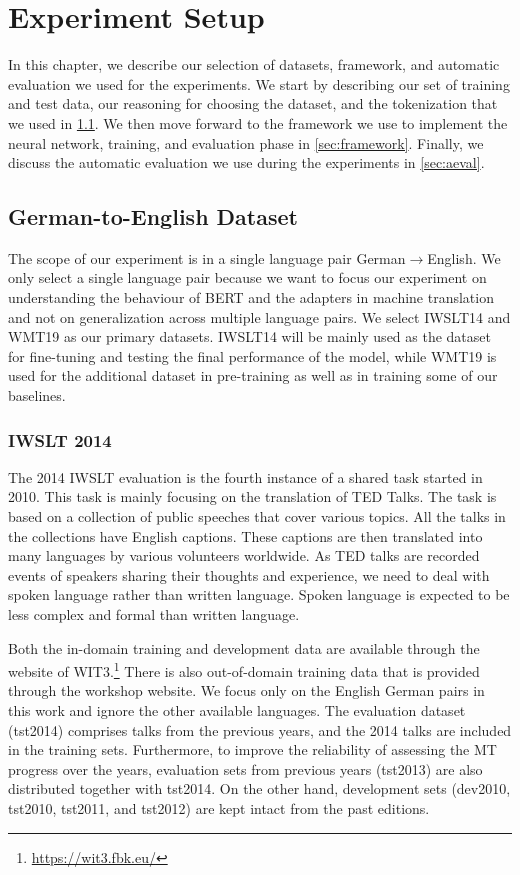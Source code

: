 
\chapter{Experiment Setup}
\label{chap:03}
In this chapter, we describe our selection of datasets, framework, and automatic evaluation we used for the experiments. We start by describing our set of training and test data, our reasoning for choosing the dataset, and the tokenization that we used in \cref{sec:dataset}. We then move forward to the framework we use to implement the neural network, training, and evaluation phase in \cref{sec:framework}. Finally, we discuss the automatic evaluation we use during the experiments in  \cref{sec:aeval}.

\section{German-to-English Dataset}
\label{sec:dataset}
The scope of our experiment is in a single language pair German$\rightarrow$English. We only select a single language pair because we want to focus our experiment on understanding the behaviour of BERT and the adapters in machine translation and not on generalization across multiple language pairs. We select IWSLT14 and WMT19 as our primary datasets. IWSLT14 will be mainly used as the dataset for fine-tuning and testing the final performance of the model, while WMT19 is used for the additional dataset in pre-training as well as in training some of our baselines.

\subsection{IWSLT 2014}
The 2014 IWSLT evaluation  is the fourth instance of a shared task started in 2010. This task is mainly focusing on the translation of TED Talks. The task is based on a collection of public speeches that cover various topics. All the talks in the collections have English captions. These captions are then translated into many languages by various volunteers worldwide. As TED talks are recorded events of speakers sharing their thoughts and experience, we need to deal with spoken language rather than written language. Spoken language is expected to be less complex and formal than written language.

Both the in-domain training and development data are available through the website of WIT3.\footnote{\url{https://wit3.fbk.eu/}} There is also out-of-domain training data that is provided through the workshop website. We focus only on the English German pairs in this work and ignore the other available languages. The evaluation dataset (tst2014) comprises talks from the previous years, and the 2014 talks are included in the training sets. Furthermore, to improve the reliability of assessing the MT progress over the years, evaluation sets from previous years (tst2013) are also distributed together with tst2014. On the other hand, development sets (dev2010, tst2010, tst2011, and tst2012) are kept intact from the past editions.

